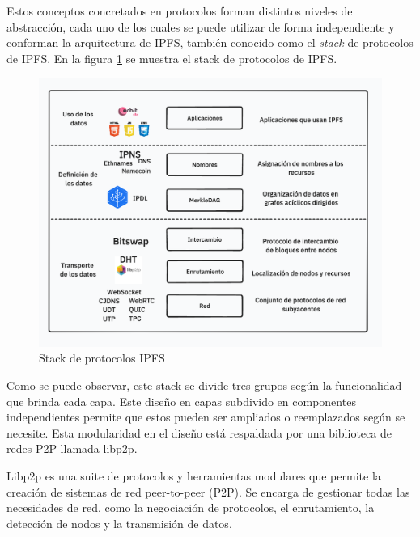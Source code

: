 Estos conceptos concretados en protocolos forman distintos niveles de abstracción, cada uno de los cuales se puede utilizar de forma independiente y conforman la arquitectura de IPFS, también conocido como el \textit{stack} de protocolos de IPFS. En la figura \ref{fig:ipfs} se muestra el stack de protocolos de IPFS.

\begin{figure}[H]
      \centering
      \includegraphics[width=\linewidth]{images/ipfs-stack.png}
      \caption{Stack de protocolos IPFS}
      \label{fig:ipfs}
\end{figure}

Como se puede observar, este stack se divide tres grupos según la funcionalidad que brinda cada capa.
Este diseño en capas subdivido en componentes independientes permite que estos pueden ser ampliados o reemplazados
según se necesite. Esta modularidad en el diseño está respaldada por una biblioteca de redes P2P llamada libp2p\cite{WhatLibp2p}.

Libp2p es una suite de protocolos y herramientas modulares que permite la creación de sistemas de red peer-to-peer (P2P). Se encarga de gestionar todas las necesidades de red, como la negociación de protocolos, el enrutamiento, la detección de nodos y la transmisión de datos.

